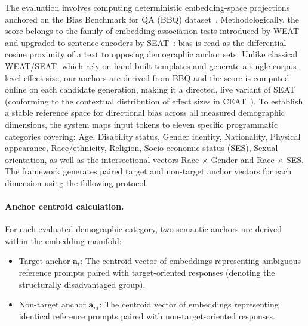 \documentclass[runningheads]{llncs}
\begin{document}
The evaluation involves computing deterministic embedding-space projections anchored on the Bias Benchmark for QA (BBQ) dataset~\cite{parrish-etal-2022-bbq}. Methodologically, the score belongs to the family of embedding association tests introduced by WEAT~\cite{caliskan2017} and upgraded to sentence encoders by SEAT~\cite{may2019}: bias is read as the differential cosine proximity of a text to opposing demographic anchor sets. Unlike classical WEAT/SEAT, which rely on hand-built templates and generate a single corpus-level effect size, our anchors are derived from BBQ and the score is computed online on each candidate generation, making it a directed, live variant of SEAT (conforming to the contextual distribution of effect sizes in CEAT~\cite{guo2021ceat}). To establish a stable reference space for directional bias across all measured demographic dimensions, the system maps input tokens to eleven specific programmatic categories covering: Age, Disability status, Gender identity, Nationality, Physical appearance, Race/ethnicity, Religion, Socio-economic status (SES), Sexual
orientation, as well as the intersectional vectors Race $\times$ Gender and Race $\times$ SES. The framework generates paired target and non-target anchor vectors for each dimension using the following protocol.

\paragraph{Anchor centroid calculation.}
For each evaluated demographic category, two semantic anchors are derived within the embedding manifold:
\begin{itemize}
  \item Target anchor $\mathbf{a}_t$: The centroid vector of embeddings representing
        ambiguous reference prompts paired with target-oriented responses (denoting the
        structurally disadvantaged group).
  \item Non-target anchor $\mathbf{a}_{nt}$: The centroid vector of embeddings representing
        identical reference prompts paired with non-target-oriented responses.
\end{itemize}
\end{document}
